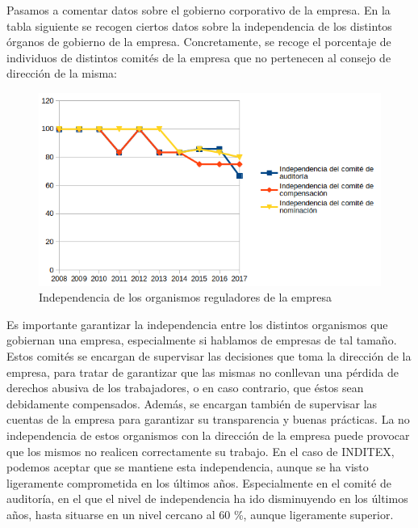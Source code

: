 \documentclass[11pt]{article}
\theoremstyle{plain}
\theoremstyle{definition}
\begin{document}
Pasamos a comentar datos sobre el gobierno corporativo de la empresa.
En la tabla siguiente se recogen ciertos datos sobre la independencia
de los distintos órganos de gobierno de la empresa. Concretamente, se
recoge el porcentaje de individuos de distintos comités de la empresa
que no pertenecen al consejo de dirección de la misma:

\begin{figure}[H]
  \centering \includegraphics[width=\textwidth]{graphs/government.png}
  \caption{Independencia de los organismos reguladores de la empresa}
\end{figure}

Es importante garantizar la independencia entre los distintos
organismos que gobiernan una empresa, especialmente si hablamos de
empresas de tal tamaño. Estos comités se encargan de supervisar las
decisiones que toma la dirección de la empresa, para tratar de
garantizar que las mismas no conllevan una pérdida de derechos abusiva
de los trabajadores, o en caso contrario, que éstos sean debidamente
compensados. Además, se encargan también de supervisar las cuentas de
la empresa para garantizar su transparencia y buenas prácticas. La no
independencia de estos organismos con la dirección de la empresa puede
provocar que los mismos no realicen correctamente su trabajo. En el
caso de INDITEX, podemos aceptar que se mantiene esta independencia,
aunque se ha visto ligeramente comprometida en los últimos
años. Especialmente en el comité de auditoría, en el que el nivel de
independencia ha ido disminuyendo en los últimos años, hasta situarse
en un nivel cercano al 60 \%, aunque ligeramente superior. 

\printbibliography
\end{document}
